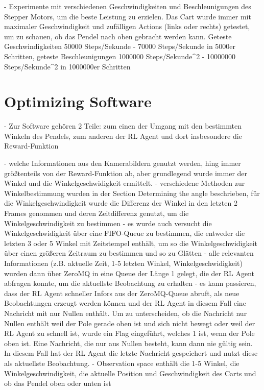 - Experimente mit verschiedenen Geschwindigkeiten und Beschleunigungen des Stepper Motors, um die beste Leistung zu erzielen. Das Cart wurde immer mit maximaler Geschwindigkeit und zufälligen Actions (links oder rechts) getestet, um zu schauen, ob das Pendel nach oben gebracht werden kann. Geteste Geschwindigkeiten 50000 Steps/Sekunde - 70000 Steps/Sekunde in 5000er Schritten, geteste Beschleunigungen 1000000 Steps/Sekunde^2 - 10000000 Steps/Sekunde^2 in 1000000er Schritten

\section{Optimizing Software}
- Zur Software gehören 2 Teile: zum einen der Umgang mit den bestimmten Winkeln des Pendels, zum anderen der RL Agent und dort insbesondere die Reward-Funktion

- welche Informationen aus den Kamerabildern genutzt werden, hing immer größtenteils von der Reward-Funktion ab, aber grundlegend wurde immer der Winkel und die Winkelgeschwidigkeit ermittelt.
- verschiedene Methoden zur Winkelbestimmung wurden in der Section Determining the angle beschrieben, für die Winkelgeschwindigkeit wurde die Differenz der Winkel in den letzten 2 Frames genommen und deren Zeitdifferenz genutzt, um die Winkelgeschwindigkeit zu bestimmen
- es wurde auch versucht die Winkelgeschwidigkeit über eine FIFO-Queue zu bestimmen, die entweder die letzten 3 oder 5 Winkel mit Zeitstempel enthält, um so die Winkelgeschwidigkeit über einen größeren Zeitraum zu bestimmen und so zu Glätten
- alle relevanten Informationen (z.B. aktuelle Zeit, 1-5 letzten Winkel, Winkelgeschwidigkeit) wurden dann über ZeroMQ in eine Queue der Länge 1 gelegt, die der RL Agent abfragen konnte, um die aktuellste Beobachtung zu erhalten
- es kann passieren, dass der RL Agent schneller Infors aus der ZeroMQ-Queue abruft, als neue Beobachtungen erzeugt werden können und der RL Agent in diesem Fall eine Nachricht mit nur Nullen enthält. Um zu unterscheiden, ob die Nachricht nur Nullen enthält weil der Pole gerade oben ist und sich nicht bewegt oder weil der RL Agent zu schnell ist, wurde ein Flag eingeführt, welches 1 ist, wenn der Pole oben ist. Eine Nachricht, die nur aus Nullen besteht, kann dann nie gültig sein. In diesem Fall hat der RL Agent die letzte Nachricht gespeichert und nutzt diese als aktuellste Beobachtung.
- Observation space enthält die 1-5 Winkel, die Winkelgeschwindigkeit, die aktuelle Position und Geschwindigkeit des Carts und ob das Pendel oben oder unten ist

